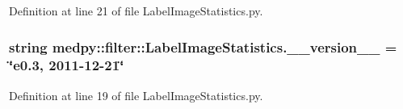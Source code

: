 Definition at line 21 of file LabelImageStatistics.py.

\hypertarget{namespacemedpy_1_1filter_1_1LabelImageStatistics_aa1f65b42f99701964070dd1bf68494ab}{
\subsubsection[{\_\-\_\-version\_\-\_\-}]{\setlength{\rightskip}{0pt plus 5cm}string {\bf medpy::filter::LabelImageStatistics.\_\-\_\-version\_\-\_\-} = \char`\"{}e0.3, 2011-\/12-\/21\char`\"{}}}
\label{namespacemedpy_1_1filter_1_1LabelImageStatistics_aa1f65b42f99701964070dd1bf68494ab}


Definition at line 19 of file LabelImageStatistics.py.

